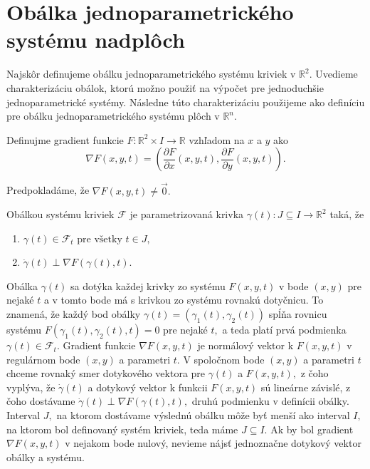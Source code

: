 \section{Obálka jednoparametrického systému nadplôch}
Najskôr definujeme obálku jednoparametrického systému kriviek v $\mathbb{R}^2$. Uvedieme charakterizáciu obálok, ktorú možno použiť na výpočet pre jednoduchšie jednoparametrické systémy. Následne túto charakterizáciu použijeme ako definíciu pre obálku jednoparametrického systému plôch v $\mathbb{R}^n$.

\begin{definition}
Definujme gradient funkcie $F \colon \mathbb{R}^2 \times I \rightarrow \mathbb{R}$ vzhľadom na $x$ a $y$ ako
$$\nabla F(x, y, t) = \left(\frac{\partial F}{\partial x}(x, y, t), \frac{\partial F}{\partial y}(x, y, t) \right).$$ 
\end{definition}
Predpokladáme, že $\nabla F(x,y,t) \neq \vec{0}. $ 

\begin{definition}
Obálkou systému kriviek $ \mathcal{F} $ je parametrizovaná krivka $\gamma(t) \colon J \subseteq I \rightarrow \mathbb{R}^{2}$ taká, že 
\begin{enumerate}
\item $\gamma(t) \in \mathcal{F}_{t} \text{ pre všetky } t \in J,$
\item $\dot{\gamma}(t) \perp \nabla F \left( \gamma(t), t \right).$
\end{enumerate}
\end{definition}

Obálka $\gamma(t)$ sa dotýka každej krivky zo systému $F(x,y,t)$ v bode $(x, y)$  pre nejaké $t$ a v tomto bode má s krivkou zo systému rovnakú dotyčnicu. To znamená, že každý bod obálky ${\gamma}(t) = (\gamma_{1}(t),\gamma_{2}(t))$ spĺňa rovnicu systému $F(\gamma_{1}(t),\gamma_{2}(t),t)=0$ pre nejaké $t,$ a teda platí prvá podmienka $\gamma(t) \in \mathcal{F}_{t}$. Gradient funkcie $ \nabla F(x,y,t)$ je normálový vektor k $F(x,y,t)$ v regulárnom bode $(x,y)$ a parametri $t$. V spoločnom bode $(x,y)$ a parametri $t$ chceme rovnaký smer dotykového vektora pre $\gamma(t)$ a $F(x,y,t), $ z čoho vyplýva, že $\dot{\gamma}(t)$ a dotykový vektor k funkcii $F(x,y,t)$ sú lineárne závislé, z čoho dostávame $\dot{\gamma}(t) \perp \nabla F \left( \gamma(t), t \right), $ druhú podmienku v definícii obálky. Interval $J,$ na ktorom dostávame výslednú obálku môže byť menší ako interval $I,$ na ktorom bol definovaný systém kriviek, teda máme $J \subseteq I.$ Ak by bol gradient $\nabla F(x,y,t) $ v nejakom bode nulový, nevieme nájsť jednoznačne dotykový vektor obálky a systému. 

